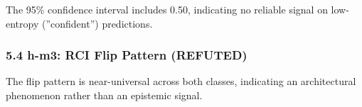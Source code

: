 \begin{table}[htbp]
\centering
{}
\end{table}

The 95\% confidence interval includes 0.50, indicating no reliable signal on low-entropy (''confident'') predictions.

\subsubsection{5.4 h-m3: RCI Flip Pattern (REFUTED)}

\begin{table}[htbp]
\centering
{}
\end{table}

The flip pattern is near-universal across both classes, indicating an architectural phenomenon rather than an epistemic signal.

